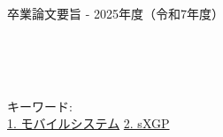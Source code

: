 卒業論文要旨 - 2025年度（令和7年度）
\begin{center}
\begin{large}
\end{large}
\end{center}
\begin{spacing}{1.2}
\small
~ \\
~ \\

\end{spacing}

キーワード:\\
\underline{1. モバイルシステム}
\underline{2. sXGP}
\begin{flushright}
\dept \\
\author
\end{flushright}
